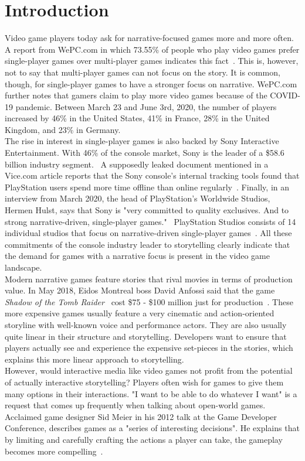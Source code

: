 \chapter{Introduction}
Video game players today ask for narrative-focused games more and more often. A report from WePC.com in which 73.55\% of people who play video games prefer single-player games over multi-player games indicates this fact~\cite{WePC2021}. This is, however, not to say that multi-player games can not focus on the story. It is common, though, for single-player games to have a stronger focus on narrative. WePC.com further notes that gamers claim to play more video games because of the COVID-19 pandemic. Between March 23 and June 3rd, 2020, the number of players increased by 46\% in the United States, 41\% in France, 28\% in the United Kingdom, and 23\% in Germany.~\cite{WePC2021}\\
The rise in interest in single-player games is also backed by Sony Interactive Entertainment. With 46\% of the console market, Sony is the leader of a \$58.6 billion industry segment.~\cite{Dealessandri2021} A supposedly leaked document mentioned in a Vice.com article reports that the Sony console's internal tracking tools found that PlayStation users spend more time offline than online regularly~\cite{Klepek2020}. Finally, in an interview from March 2020, the head of PlayStation's Worldwide Studios, Hermen Hulst, says that Sony is "very committed to quality exclusives. And to strong narrative-driven, single-player games."~\cite{Shuman2021} PlayStation Studios consists of 14 individual studios that focus on narrative-driven single-player games~\cite{Sony2021}. All these commitments of the console industry leader to storytelling clearly indicate that the demand for games with a narrative focus is present in the video game landscape.\\
Modern narrative games feature stories that rival movies in terms of production value. In May 2018, Eidos Montreal boss David Anfossi said that the game \textit{Shadow of the Tomb Raider}~\cite{tombraider} cost \$75 - \$100 million just for production~\cite{Dring2018}. These more expensive games usually feature a very cinematic and action-oriented storyline with well-known voice and performance actors. They are also usually quite linear in their structure and storytelling. Developers want to ensure that players actually see and experience the expensive set-pieces in the stories, which explains this more linear approach to storytelling.\\
However, would interactive media like video games not profit from the potential of actually interactive storytelling? Players often wish for games to give them many options in their interactions. "I want to be able to do whatever I want" is a request that comes up frequently when talking about open-world games. Acclaimed game designer Sid Meier in his 2012 talk at the Game Developer Conference, describes games as a "series of interesting decisions". He explains that by limiting and carefully crafting the actions a player can take, the gameplay becomes more compelling~\cite{Dring2018}.\\
